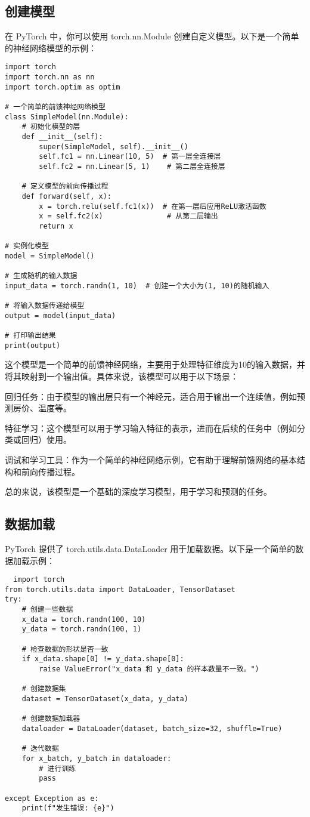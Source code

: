 \documentclass[a4paper, 12pt]{article}
\begin{document}
   
\subsection{创建模型}
在 PyTorch 中，你可以使用 torch.nn.Module 创建自定义模型。以下是一个简单的神经网络模型的示例：

\begin{verbatim}
import torch
import torch.nn as nn
import torch.optim as optim

# 一个简单的前馈神经网络模型
class SimpleModel(nn.Module):
    # 初始化模型的层
    def __init__(self):
        super(SimpleModel, self).__init__()
        self.fc1 = nn.Linear(10, 5)  # 第一层全连接层
        self.fc2 = nn.Linear(5, 1)    # 第二层全连接层

    # 定义模型的前向传播过程
    def forward(self, x):
        x = torch.relu(self.fc1(x))  # 在第一层后应用ReLU激活函数
        x = self.fc2(x)               # 从第二层输出
        return x

# 实例化模型
model = SimpleModel()

# 生成随机的输入数据
input_data = torch.randn(1, 10)  # 创建一个大小为(1, 10)的随机输入

# 将输入数据传递给模型
output = model(input_data)

# 打印输出结果
print(output)
  \end{verbatim}

这个模型是一个简单的前馈神经网络，主要用于处理特征维度为10的输入数据，并将其映射到一个输出值。具体来说，该模型可以用于以下场景：

回归任务：由于模型的输出层只有一个神经元，适合用于输出一个连续值，例如预测房价、温度等。

特征学习：这个模型可以用于学习输入特征的表示，进而在后续的任务中（例如分类或回归）使用。

调试和学习工具：作为一个简单的神经网络示例，它有助于理解前馈网络的基本结构和前向传播过程。

总的来说，该模型是一个基础的深度学习模型，用于学习和预测的任务。

\subsection{数据加载}
PyTorch 提供了 torch.utils.data.DataLoader 用于加载数据。以下是一个简单的数据加载示例：

\begin{verbatim}
  import torch
from torch.utils.data import DataLoader, TensorDataset
try:
    # 创建一些数据
    x_data = torch.randn(100, 10)
    y_data = torch.randn(100, 1)

    # 检查数据的形状是否一致
    if x_data.shape[0] != y_data.shape[0]:
        raise ValueError("x_data 和 y_data 的样本数量不一致。")

    # 创建数据集
    dataset = TensorDataset(x_data, y_data)

    # 创建数据加载器
    dataloader = DataLoader(dataset, batch_size=32, shuffle=True)

    # 迭代数据
    for x_batch, y_batch in dataloader:
        # 进行训练
        pass

except Exception as e:
    print(f"发生错误: {e}")

  \end{verbatim}
\end{document}

